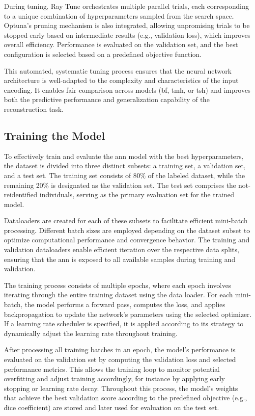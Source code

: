 During tuning, Ray Tune orchestrates multiple parallel trials, each corresponding to a unique combination of hyperparameters sampled from the search space.
Optuna's pruning mechanism is also integrated, allowing unpromising trials to be stopped early based on intermediate results (e.g., validation loss), which improves overall efficiency.
Performance is evaluated on the validation set, and the best configuration is selected based on a predefined objective function.

This automated, systematic tuning process ensures that the neural network architecture is well-adapted to the complexity and characteristics of the input encoding.
It enables fair comparison across models (\ac{bf}, \ac{tmh}, or \ac{tsh}) and improves both the predictive performance and generalization capability of the reconstruction task.

\subsection{Training the Model} \label{sec:training}

To effectively train and evaluate the \ac{ann} model with the best hyperparameters, the dataset is divided into three distinct subsets: a training set, a validation set, and a test set.
The training set consists of 80\% of the labeled dataset, while the remaining 20\% is designated as the validation set.
The test set comprises the not-reidentified individuals, serving as the primary evaluation set for the trained model.

Dataloaders are created for each of these subsets to facilitate efficient mini-batch processing.
Different batch sizes are employed depending on the dataset subset to optimize computational performance and convergence behavior.
The training and validation dataloaders enable efficient iteration over the respective data splits, ensuring that the \ac{ann} is exposed to all available samples during training and validation.

The training process consists of multiple epochs, where each epoch involves iterating through the entire training dataset using the data loader.
For each mini-batch, the model performs a forward pass, computes the loss, and applies backpropagation to update the network’s parameters using the selected optimizer.
If a learning rate scheduler is specified, it is applied according to its strategy to dynamically adjust the learning rate throughout training.

After processing all training batches in an epoch, the model’s performance is evaluated on the validation set by computing the validation loss and selected performance metrics.
This allows the training loop to monitor potential overfitting and adjust training accordingly, for instance by applying early stopping or learning rate decay.
Throughout this process, the model's weights that achieve the best validation score according to the predefined objective (e.g., dice coefficient) are stored and later used for evaluation on the test set.


